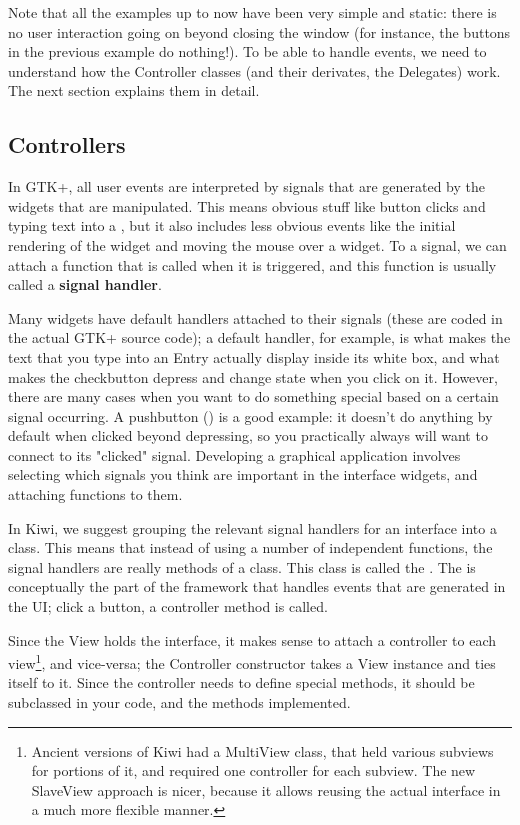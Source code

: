 \documentclass[a4paper]{howto}
\begin{document}
Note that all the examples up to now have been very simple and static:
there is no user interaction going on beyond closing the window (for
instance, the buttons in the previous example do nothing!). To be able
to handle events, we need to understand how the Controller classes (and
their derivates, the Delegates) work. The next section explains them in
detail.

\subsection{Controllers}
\label{callbacks}

In GTK+, all user events are interpreted by signals that are generated
by the widgets that are manipulated. This means obvious stuff like
button clicks and typing text into a , but it also
includes less obvious events like the initial rendering of the widget
and moving the mouse over a widget. To a signal, we can attach a
function that is called when it is triggered, and this function is
usually called a {\bf signal handler}.

Many widgets have default handlers attached to their signals (these are
coded in the actual GTK+ source code); a default handler, for example,
is what makes the text that you type into an Entry actually display
inside its white box, and what makes the checkbutton depress and change
state when you click on it. However, there are many cases when you want
to do something special based on a certain signal occurring. A pushbutton
() is a good example: it doesn't do anything by default
when clicked beyond depressing, so you practically always will want to
connect to its "clicked" signal. Developing a graphical application
involves selecting which signals you think are important in the
interface widgets, and attaching functions to them.

In Kiwi, we suggest grouping the relevant signal handlers for an
interface into a class. This means that instead of using a number of
independent functions, the signal handlers are really methods of
a class. This class is called the . The
 is conceptually the part of the framework that
handles events that are generated in the UI; click a button, a
controller method is called.

Since the View holds the interface, it makes sense to attach a
controller to each view\footnote{Ancient versions of Kiwi had a
MultiView class, that held various subviews for portions of it, and
required one controller for each subview. The new SlaveView approach is
nicer, because it allows reusing the actual interface in a much more
flexible manner.}, and vice-versa; the Controller constructor takes a
View instance and ties itself to it. Since the controller needs to
define special methods, it should be subclassed in your code, and the
methods implemented.
\end{document}
